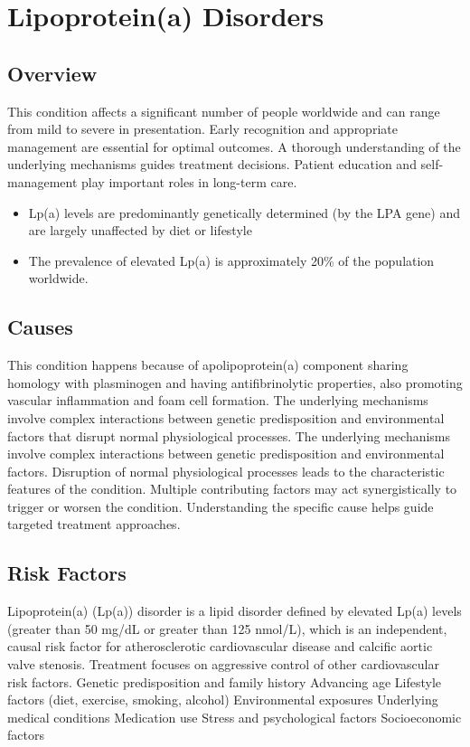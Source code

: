 \chapter{Lipoprotein(a) Disorders}
\label{sec:Lipoprotein(a) Disorders}

\section{Overview}
This condition affects a significant number of people worldwide and can range from mild to severe in presentation. Early recognition and appropriate management are essential for optimal outcomes. A thorough understanding of the underlying mechanisms guides treatment decisions. Patient education and self-management play important roles in long-term care.

\begin{itemize}[noitemsep]
  \item Lp(a) levels are predominantly genetically determined (by the LPA gene) and are largely unaffected by diet or lifestyle
  \item The prevalence of elevated Lp(a) is approximately 20\% of the population worldwide.
\end{itemize}
\section{Causes}
This condition happens because of apolipoprotein(a) component sharing homology with plasminogen and having antifibrinolytic properties, also promoting vascular inflammation and foam cell formation. The underlying mechanisms involve complex interactions between genetic predisposition and environmental factors that disrupt normal physiological processes. The underlying mechanisms involve complex interactions between genetic predisposition and environmental factors. Disruption of normal physiological processes leads to the characteristic features of the condition. Multiple contributing factors may act synergistically to trigger or worsen the condition. Understanding the specific cause helps guide targeted treatment approaches.
\section{Risk Factors}
Lipoprotein(a) (Lp(a)) disorder is a lipid disorder defined by elevated Lp(a) levels (greater than 50 mg/dL or greater than 125 nmol/L), which is an independent, causal risk factor for atherosclerotic cardiovascular disease and calcific aortic valve stenosis. Treatment focuses on aggressive control of other cardiovascular risk factors. Genetic predisposition and family history Advancing age Lifestyle factors (diet, exercise, smoking, alcohol) Environmental exposures Underlying medical conditions Medication use Stress and psychological factors Socioeconomic factors

